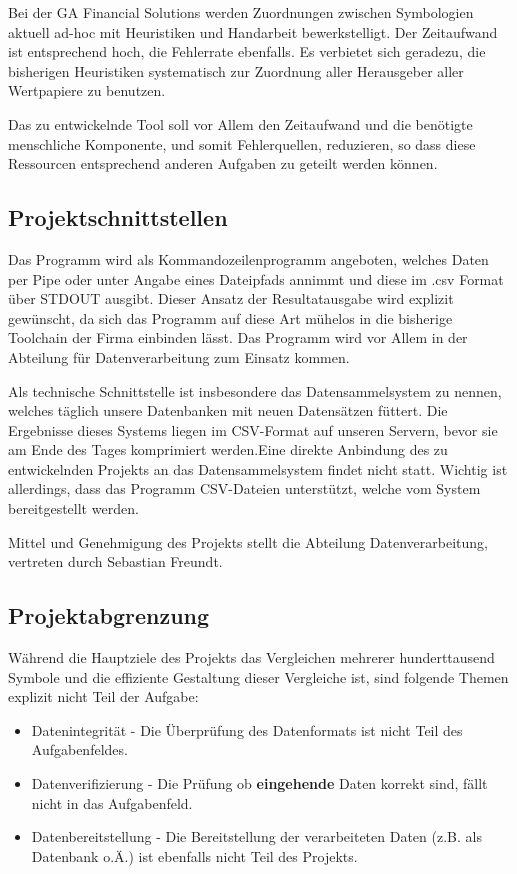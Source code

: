 Bei der GA Financial Solutions werden Zuordnungen zwischen Symbologien
aktuell ad-hoc mit Heuristiken und Handarbeit bewerkstelligt.  Der
Zeitaufwand ist entsprechend hoch, die Fehlerrate ebenfalls.  Es
verbietet sich geradezu, die bisherigen Heuristiken systematisch zur
Zuordnung aller Herausgeber aller Wertpapiere zu benutzen.\par

Das zu entwickelnde Tool soll vor Allem den Zeitaufwand und die benötigte
menschliche Komponente, und somit Fehlerquellen, reduzieren, so dass diese Ressourcen entsprechend
anderen Aufgaben zu geteilt werden können.\par

\subsection{Projektschnittstellen}
Das Programm wird als Kommandozeilenprogramm angeboten, welches
Daten per Pipe oder unter Angabe eines Dateipfads annimmt und diese im .csv 
Format über STDOUT ausgibt. Dieser Ansatz der Resultatausgabe wird explizit gewünscht, 
da sich das Programm auf diese Art mühelos in die bisherige Toolchain der Firma einbinden lässt.
Das Programm wird vor Allem in der Abteilung für Datenverarbeitung zum Einsatz kommen.\par

Als technische Schnittstelle ist insbesondere das Datensammelsystem zu nennen,
welches täglich unsere Datenbanken mit neuen Datensätzen füttert. Die Ergebnisse
dieses Systems liegen im CSV-Format auf unseren Servern, bevor sie am Ende des
Tages komprimiert werden.Eine direkte Anbindung des zu entwickelnden Projekts an das Datensammelsystem findet nicht statt. Wichtig ist allerdings, dass das Programm CSV-Dateien unterstützt, welche vom System bereitgestellt werden.\par

Mittel und Genehmigung des Projekts stellt die Abteilung Datenverarbeitung,
vertreten durch Sebastian Freundt.\par

\subsection{Projektabgrenzung}
Während die Hauptziele des Projekts das Vergleichen mehrerer hunderttausend Symbole und die effiziente Gestaltung dieser Vergleiche ist, sind folgende Themen explizit nicht Teil der Aufgabe:

\begin{itemize}
    \item Datenintegrität - Die Überprüfung des Datenformats ist nicht Teil des Aufgabenfeldes.
    \item Datenverifizierung - Die Prüfung ob \textbf{eingehende} Daten korrekt sind, fällt nicht in das Aufgabenfeld.
    \item Datenbereitstellung - Die Bereitstellung der verarbeiteten Daten (z.B. als Datenbank o.Ä.) ist ebenfalls nicht Teil des Projekts.
\end{itemize}
\clearpage

